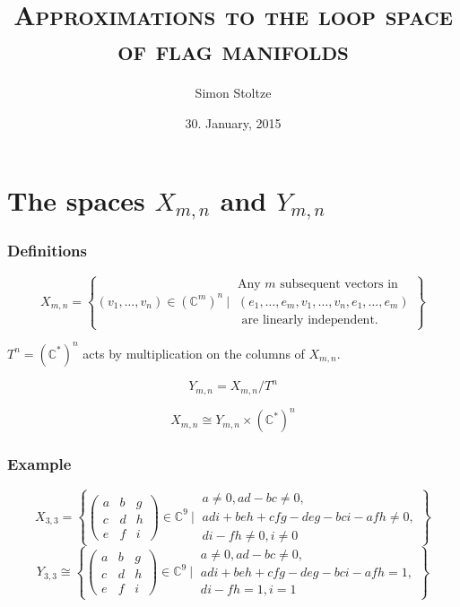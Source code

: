 \documentclass{beamer} %
\author{Simon Stoltze}
\date{30. January, 2015}
\title[The loop space of flag manifolds]{\textsc{Approximations to the loop space of flag manifolds}}
\institute[IMF]{Institut for Matematik\\Aarhus University}
\newcommand{\C}{\mathbb{C}}
\newcommand{\delim}{\:}
\newcommand{\sdel}{\delim\Bigg\vert\delim}
\newcommand{\set}[1]{\left\{ #1 \right\}}
\begin{document}
\begin{frame}
  \titlepage
\end{frame}

\section{The spaces $X_{m,n}$ and $Y_{m,n}$}

\begin{frame}
  \frametitle{Definitions}
  \begin{definition}
    \[ X_{m,n} = \set{(v_1,\dots,v_n) \in (\C^m)^n \delim\Bigg\vert\delim
      \begin{matrix}
        \text{Any } m \text{ subsequent vectors in } \\
        (e_1,\dots,e_m,v_1,\dots,v_n,e_1,\dots,e_m) \\
        \text{ are linearly independent.}
      \end{matrix} } \]
  \end{definition}
  $T^n= (\C^*)^n$ acts by multiplication on the columns of
  $X_{m,n}$. \pause
  \begin{definition}
    \[ Y_{m,n}  = X_{m,n}/T^n \]
  \end{definition} \pause
  \[ X_{m,n} \cong Y_{m,n} \times (\C^*)^n \]
\end{frame}

\begin{frame}
  \frametitle{Example}
  \[ X_{3,3} = \set{ 
    \begin{pmatrix}
      a & b & g \\
      c & d & h \\
      e & f & i
    \end{pmatrix} \in \C^9\sdel
    \begin{matrix}
      a \neq 0, ad-bc \neq 0, \\
      adi+beh+cfg-deg-bci-afh \neq 0, \\
      di-fh \neq 0, i \neq 0
    \end{matrix}
  } \]
  \pause
  \[ Y_{3,3} \cong \set{
    \begin{pmatrix}
      a & b & g \\
      c & d & h \\
      e & f & i
    \end{pmatrix} \in \C^9\sdel
    \begin{matrix}
      a \neq 0, ad-bc \neq 0, \\
      adi+beh+cfg-deg-bci-afh = 1, \\
      di-fh = 1, i = 1
    \end{matrix} } \]
\end{frame}
\end{document}
